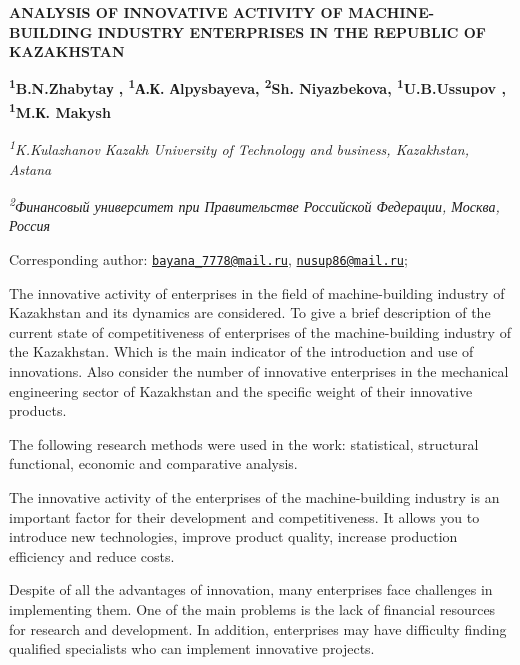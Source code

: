 
\begin{articleheader}
{\bfseries ANALYSIS OF INNOVATIVE ACTIVITY OF MACHINE-BUILDING INDUSTRY
ENTERPRISES IN THE REPUBLIC OF KAZAKHSTAN}

{\bfseries 
\textsuperscript{1}B.N.Zhabytaу\textsuperscript{\envelope } \authorid,
\textsuperscript{1}А.К. Аlpysbayeva\authorid,
\textsuperscript{2}Sh. Niyazbekova\authorid,
\textsuperscript{1}U.B.Ussupov\textsuperscript{\envelope } \authorid,
\textsuperscript{1}M.К. Makysh\authorid}
\end{articleheader}

\begin{affiliation}
\emph{\textsuperscript{1}K.Kulazhanov Kazakh University of Technology
and business, Kazakhstan, Astana}

\emph{\textsuperscript{2}Финансовый университет при Правительстве
Российской Федерации, Москва, Россия}

\raggedright \textsuperscript{\envelope }Corresponding author: \href{mailto:bayana_7778@mail.ru}{\nolinkurl{bayana\_7778@mail.ru}}, \href{mailto:nusup86@mail.ru}{\nolinkurl{nusup86@mail.ru}};
\end{affiliation}

The innovative activity of enterprises in the field of machine-building
industry of Kazakhstan and its dynamics are considered. To give a brief
description of the current state of competitiveness of enterprises of
the machine-building industry of the Kazakhstan. Which is the main
indicator of the introduction and use of innovations. Also consider the
number of innovative enterprises in the mechanical engineering sector of
Kazakhstan and the specific weight of their innovative products.

The following research methods were used in the work: statistical,
structural functional, economic and comparative analysis.

The innovative activity of the enterprises of the machine-building
industry is an important factor for their development and
competitiveness. It allows you to introduce new technologies, improve
product quality, increase production efficiency and reduce costs.

Despite of all the advantages of innovation, many enterprises face
challenges in implementing them. One of the main problems is the lack of
financial resources for research and development. In addition,
enterprises may have difficulty finding qualified specialists who can
implement innovative projects.

